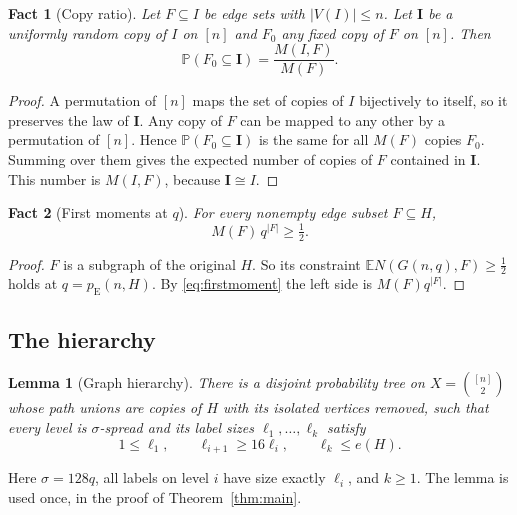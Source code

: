 \documentclass[11pt]{article}
\newtheorem{lemma}[theorem]{Lemma}
\newtheorem{fact}{Fact}
\numberwithin{equation}{section}
\newcommand{\PP}{\mathbb P}
\newcommand{\EE}{\mathbb E}
\newcommand{\pE}{p_{\mathrm E}}
\begin{document}
\begin{fact}[Copy ratio]\label{fact:C}
Let $F\subseteq I$ be edge sets with $|V(I)|\le n$. Let
$\boldsymbol I$ be a uniformly random copy of $I$ on $[n]$ and $F_0$
any fixed copy of $F$ on $[n]$. Then
\begin{equation}\label{eq:copy-ratio}
 \PP(F_0\subseteq\boldsymbol I)=\frac{M(I,F)}{M(F)}.
\end{equation}
\end{fact}

\begin{proof}
A permutation of $[n]$ maps the set of copies of $I$ bijectively to
itself, so it preserves the law of $\boldsymbol I$. Any copy of $F$
can be mapped to any other by a permutation of $[n]$. Hence
$\PP(F_0\subseteq\boldsymbol I)$ is the same for all $M(F)$ copies
$F_0$. Summing over them gives the expected number of copies of $F$
contained in $\boldsymbol I$. This number is $M(I,F)$, because
$\boldsymbol I\cong I$.
\end{proof}

\begin{fact}[First moments at $q$]\label{fact:D}
For every nonempty edge subset $F\subseteq H$,
\begin{equation}\label{eq:fm}
 M(F)\,q^{|F|}\ge\tfrac12 .
\end{equation}
\end{fact}

\begin{proof}
$F$ is a subgraph of the original $H$. So its constraint
$\EE N(G(n,q),F)\ge\frac12$ holds at $q=\pE(n,H)$. By
\eqref{eq:firstmoment} the left side is $M(F)q^{|F|}$.
\end{proof}

\subsection{The hierarchy}

\begin{lemma}[Graph hierarchy]\label{lem:hierarchy}
There is a disjoint probability tree on
$X=\binom{[n]}2$ whose path unions are copies of $H$ with its isolated
vertices removed, such that every level is $\sigma$-spread and its label
sizes $\ell_1,\ldots,\ell_k$ satisfy
\[
 1\le\ell_1,\qquad \ell_{i+1}\ge16\ell_i,
 \qquad \ell_k\le e(H).
\]
\end{lemma}

Here $\sigma=128q$, all labels on level $i$ have size exactly
$\ell_i$, and $k\ge1$. The lemma is used once, in the proof of
Theorem~\ref{thm:main}.
\end{document}
